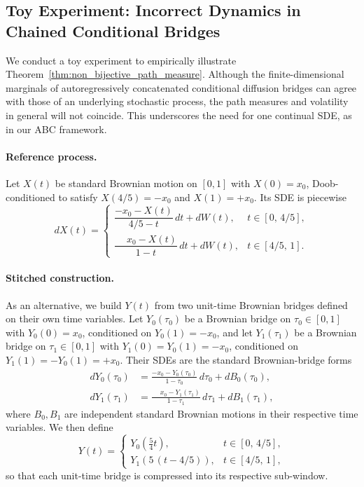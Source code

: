 \subsection{Toy Experiment: Incorrect Dynamics in Chained Conditional Bridges}
\label{sec:stitched-vs-conditioned}

We conduct a toy experiment to empirically illustrate Theorem~\ref{thm:non_bijective_path_measure}.
Although the finite-dimensional marginals of autoregressively concatenated conditional diffusion bridges can agree with those of an underlying stochastic process, the path measures and volatility in general will not coincide. This underscores the need for one continual SDE, as in our ABC framework.

\paragraph{Reference process.}
Let $X(t)$ be standard Brownian motion on $[0,1]$ with $X(0)=x_0$, Doob-conditioned \cite{doob1984classical} to satisfy $X(4/5)=-x_0$ and $X(1)=+x_0$. Its SDE is piecewise \cite{karatzas2014brownian, oksendal2003stochastic, steele2001stochastic}
\begin{equation}
dX(t) =
\begin{cases}
\dfrac{-x_0 - X(t)}{4/5 - t}\,dt + dW(t), & t \in [0,\,4/5],\\[6pt]
\dfrac{\phantom{-}x_0 - X(t)}{1 - t}\,dt + dW(t), & t \in [4/5,\,1].
\end{cases}
\end{equation}

\paragraph{Stitched construction.}
As an alternative, we build $Y(t)$ from two unit-time Brownian bridges
defined on their own time variables. Let $Y_0(\tau_0)$ be a Brownian
bridge on $\tau_0\in[0,1]$ with $Y_0(0)=x_0$, conditioned on
$Y_0(1)=-x_0$, and let $Y_1(\tau_1)$ be a Brownian bridge on
$\tau_1\in[0,1]$ with $Y_1(0)=Y_0(1)=-x_0$, conditioned on
$Y_1(1)=-Y_0(1)=+x_0$. Their SDEs are the standard Brownian-bridge
forms
\begin{align}
dY_0(\tau_0) &= \frac{-x_0 - Y_0(\tau_0)}{1-\tau_0}\,d\tau_0 + dB_0(\tau_0),\\
dY_1(\tau_1) &= \frac{\phantom{-}x_0 - Y_1(\tau_1)}{1-\tau_1}\,d\tau_1 + dB_1(\tau_1),
\end{align}
where $B_0,B_1$ are independent standard Brownian motions in their
respective time variables. We then define
\begin{equation}
Y(t) =
\begin{cases}
Y_0\!\left(\tfrac{5}{4}t\right), & t\in[0,\,4/5],\\[4pt]
Y_1\!\left(5\,(t-4/5)\right),    & t\in[4/5,\,1],
\end{cases}
\end{equation}
so that each unit-time bridge is compressed into its respective
sub-window.

